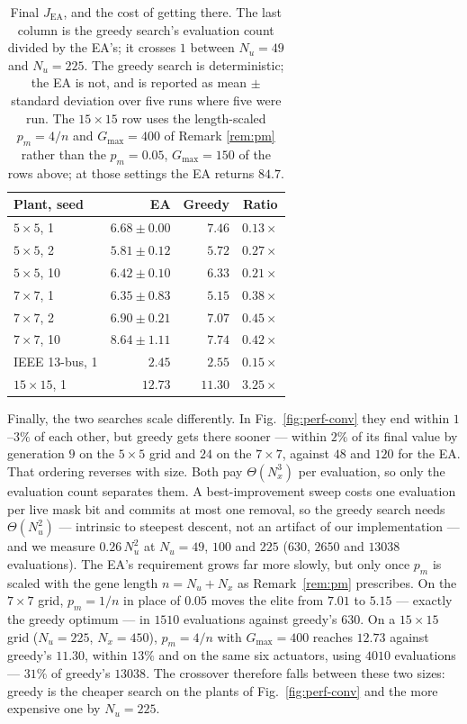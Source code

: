 \documentclass[letterpaper, 10pt, conference]{ieeeconf}
\begin{document}
\begin{table}[t]
\centering
\caption{Final $J_\mathrm{EA}$, and the cost of getting there. The last column
is the greedy search's evaluation count divided by the EA's; it crosses $1$
between $N_u = 49$ and $N_u = 225$. The greedy search is deterministic; the EA
is not, and is reported as mean $\pm$ standard deviation over five runs where
five were run. The $15\times15$ row uses the length-scaled $p_m = 4/n$ and
$G_{\max} = 400$ of Remark \ref{rem:pm} rather than the $p_m = 0.05$,
$G_{\max} = 150$ of the rows above; at those settings the EA returns $84.7$.}
\label{tab:greedy}
\begin{tabular}{lrrc}
\toprule
Plant, seed & EA & Greedy & Ratio \\
\midrule
$5\!\times\!5$, 1   & $\mathbf{6.68 \pm 0.00}$ & $7.46$ & $0.13\times$ \\
$5\!\times\!5$, 2   & $5.81 \pm 0.12$ & $\mathbf{5.72}$ & $0.27\times$ \\
$5\!\times\!5$, 10  & $6.42 \pm 0.10$ & $\mathbf{6.33}$ & $0.21\times$ \\
$7\!\times\!7$, 1   & $6.35 \pm 0.83$ & $\mathbf{5.15}$ & $0.38\times$ \\
$7\!\times\!7$, 2   & $\mathbf{6.90 \pm 0.21}$ & $7.07$ & $0.45\times$ \\
$7\!\times\!7$, 10  & $8.64 \pm 1.11$ & $\mathbf{7.74}$ & $0.42\times$ \\
IEEE 13-bus, 1      & $\mathbf{2.45}$ & $2.55$ & $0.15\times$ \\
\midrule
$15\!\times\!15$, 1 & $12.73$ & $\mathbf{11.30}$ & $\mathbf{3.25\times}$ \\
\bottomrule
\end{tabular}
\end{table}

Finally, the two searches scale differently. In Fig.~\ref{fig:perf-conv} they
end within $1$--$3\%$ of each other, but greedy gets there sooner --- within
$2\%$ of its final value by generation $9$ on the $5\times5$ grid and $24$ on
the $7\times7$, against $48$ and $120$ for the EA. That ordering reverses with
size. Both pay $\Theta(N_x^3)$ per evaluation, so only the evaluation count
separates them. A best-improvement sweep costs one evaluation per live mask bit
and commits at most one removal, so the greedy search needs
$\Theta(N_u^2)$ --- intrinsic to steepest descent, not an artifact of our
implementation --- and we measure $0.26\,N_u^2$ at $N_u = 49$, $100$ and $225$
($630$, $2650$ and $13038$ evaluations). The EA's requirement grows far more
slowly, but only once $p_m$ is scaled with the gene length $n = N_u + N_x$ as
Remark~\ref{rem:pm} prescribes. On the $7\times7$ grid, $p_m = 1/n$ in place of
$0.05$ moves the elite from $7.01$ to $5.15$ --- exactly the greedy optimum ---
in $1510$ evaluations against greedy's $630$. On a $15\times15$ grid
($N_u = 225$, $N_x = 450$), $p_m = 4/n$ with $G_{\max} = 400$ reaches $12.73$
against greedy's $11.30$, within $13\%$ and on the same six actuators, using
$4010$ evaluations --- $31\%$ of greedy's $13038$. The crossover therefore falls
between these two sizes: greedy is the cheaper search on the plants of
Fig.~\ref{fig:perf-conv} and the more expensive one by $N_u = 225$.
\end{document}
